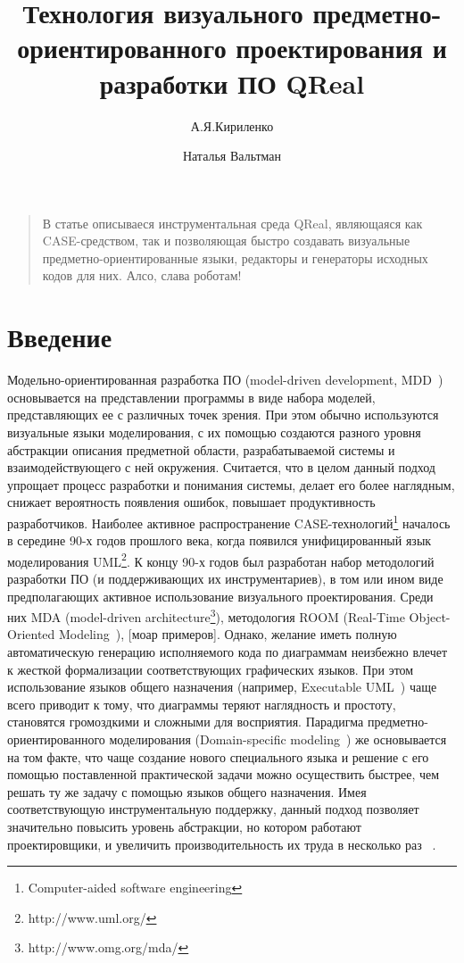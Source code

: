 \documentclass[a4paper]{article}
\title{Технология визуального предметно-ориентированного проектирования и разработки ПО QReal}
\author{А.Я.Кириленко \and Наталья Вальтман}
\date{}
\begin{document}
\maketitle
\thispagestyle{empty}

\begin{quote}
\small\noindent
В статье описываеся инструментальная среда QReal, являющаяся как CASE-средством, так и позволяющая быстро создавать визуальные предметно-ориентированные языки, редакторы и генераторы исходных кодов для них. Алсо, слава роботам!
\end{quote}

\section*{Введение}

Модельно-ориентированная разработка ПО (model-driven development, MDD~\cite{mdd}) основывается на представлении программы в виде набора моделей, представляющих ее с различных точек зрения. При этом обычно используются визуальные языки моделирования, с их помощью создаются разного уровня абстракции описания предметной области, разрабатываемой системы и взаимодействующего с ней окружения. Считается, что в целом данный подход упрощает процесс разработки и понимания системы, делает его более наглядным, снижает вероятность появления ошибок, повышает продуктивность разработчиков. Наиболее активное распространение CASE-технологий\footnote{Computer-aided software engineering}  началось в середине 90-х годов прошлого века, когда появился унифицированный язык моделирования UML\footnote{http://www.uml.org/}. К концу 90-х годов был разработан набор методологий разработки ПО (и поддерживающих их инструментариев), в том или ином виде предполагающих активное использование визуального проектирования. Среди них MDA (model-driven architecture\footnote{http://www.omg.org/mda/}), методология ROOM (Real-Time Object-Oriented Modeling~\cite{room}), [моар примеров]. Однако, желание иметь полную автоматическую генерацию исполняемого кода по диаграммам неизбежно влечет к жесткой формализации соответствующих графических языков. При этом использование языков общего назначения (например, Executable UML~\cite{xuml}) чаще всего приводит к тому, что диаграммы теряют наглядность и простоту, становятся громоздкими и сложными для восприятия. Парадигма предметно-ориентированного моделирования (Domain-specific modeling~\cite{theBook}) же основывается на том факте, что чаще создание нового специального языка и решение с его помощью поставленной практической задачи можно осуществить быстрее, чем решать ту же задачу с помощью языков общего назначения. Имея соответствующую инструментальную поддержку, данный подход позволяет значительно повысить уровень абстракции, но котором работают проектировщики, и увеличить производительность их труда в несколько раз ~\cite{dsm01, dsm02, dsm03}.
\end{document}

